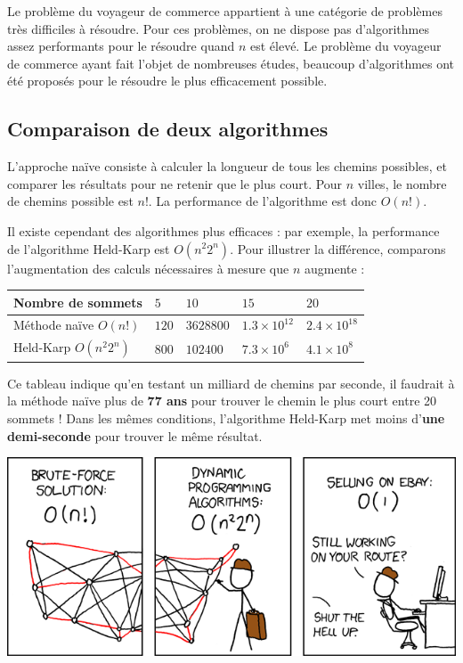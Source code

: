 Le problème du voyageur de commerce appartient à une catégorie de problèmes très difficiles à résoudre. Pour ces problèmes, on ne dispose pas d'algorithmes assez performants pour le résoudre quand $n$ est élevé. Le problème du voyageur de commerce ayant fait l'objet de nombreuses études, beaucoup d'algorithmes ont été proposés pour le résoudre le plus efficacement possible.

\subsection*{Comparaison de deux algorithmes}

L'approche naïve consiste à calculer la longueur de tous les chemins possibles, et comparer les résultats pour ne retenir que le plus court. Pour $n$ villes, le nombre de chemins possible est $n!$. La performance de l'algorithme est donc $O(n!)$.

Il existe cependant des algorithmes plus efficaces : par exemple, la performance de l'algorithme Held-Karp est $O(n^{2}2^n)$. Pour illustrer la différence, comparons l'augmentation des calculs nécessaires à mesure que $n$ augmente :

\begin{center}
  \begin{tabular}{|l|llll|}
    \hline
    Nombre de sommets       & $5$   & $10$      & $15$            & $20$ \\
    \hline
    Méthode naïve $O(n!)$   & $120$ & $3628800$ & $1.3 \times 10^{12}$ & $2.4 \times 10^{18}$ \\
    Held-Karp $O(n^{2}2^n)$ & $800$ & $102400$  & $7.3 \times 10^6$       & $4.1 \times 10^8$ \\
    \hline
  \end{tabular} 
\end{center}

Ce tableau indique qu'en testant un milliard de chemins par seconde, il faudrait à la méthode naïve plus de \textbf{77 ans} pour trouver le chemin le plus court entre 20 sommets ! Dans les mêmes conditions, l'algorithme Held-Karp met moins d'\textbf{une demi-seconde} pour trouver le même résultat.

  \begin{center}
    \includegraphics[width=\linewidth]{img/tsp_xkcd.png}
    \label{img:tsp_xkcd}
  \end{center}

